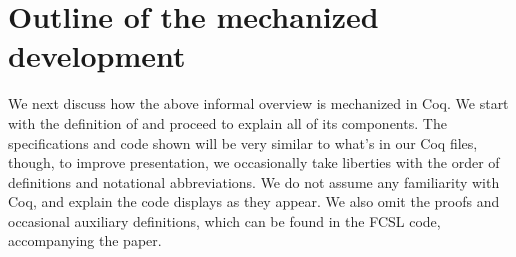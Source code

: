 
\section{Outline of the mechanized development}
\label{sec:devel}

We next discuss how the above informal overview is mechanized in
Coq. We start with the definition of  and proceed to
explain all of its components.
%
%
The specifications and code shown will be very similar to what's in
our Coq files, though, to improve presentation, we occasionally take
liberties with the order of definitions and notational
abbreviations. We do not assume any familiarity with Coq, and explain
the code displays as they appear. We also omit the proofs and
occasional auxiliary definitions, which can be found in the FCSL code,
accompanying the paper.

